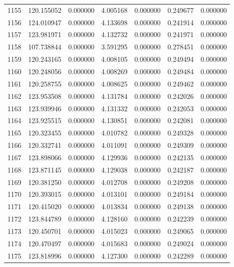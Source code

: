 \begin{tabular}{rrrrrrr}
1155 & 120.155052 &    0.000000 &  4.005168 &   0.000000 &   0.249677 &  0.000000 \\
1156 & 124.010947 &    0.000000 &  4.133698 &   0.000000 &   0.241914 &  0.000000 \\
1157 & 123.981971 &    0.000000 &  4.132732 &   0.000000 &   0.241971 &  0.000000 \\
1158 & 107.738844 &    0.000000 &  3.591295 &   0.000000 &   0.278451 &  0.000000 \\
1159 & 120.243165 &    0.000000 &  4.008105 &   0.000000 &   0.249494 &  0.000000 \\
1160 & 120.248056 &    0.000000 &  4.008269 &   0.000000 &   0.249484 &  0.000000 \\
1161 & 120.258755 &    0.000000 &  4.008625 &   0.000000 &   0.249462 &  0.000000 \\
1162 & 123.953508 &    0.000000 &  4.131784 &   0.000000 &   0.242026 &  0.000000 \\
1163 & 123.939946 &    0.000000 &  4.131332 &   0.000000 &   0.242053 &  0.000000 \\
1164 & 123.925515 &    0.000000 &  4.130851 &   0.000000 &   0.242081 &  0.000000 \\
1165 & 120.323455 &    0.000000 &  4.010782 &   0.000000 &   0.249328 &  0.000000 \\
1166 & 120.332741 &    0.000000 &  4.011091 &   0.000000 &   0.249309 &  0.000000 \\
1167 & 123.898066 &    0.000000 &  4.129936 &   0.000000 &   0.242135 &  0.000000 \\
1168 & 123.871145 &    0.000000 &  4.129038 &   0.000000 &   0.242187 &  0.000000 \\
1169 & 120.381250 &    0.000000 &  4.012708 &   0.000000 &   0.249208 &  0.000000 \\
1170 & 120.393015 &    0.000000 &  4.013101 &   0.000000 &   0.249184 &  0.000000 \\
1171 & 120.415020 &    0.000000 &  4.013834 &   0.000000 &   0.249138 &  0.000000 \\
1172 & 123.844789 &    0.000000 &  4.128160 &   0.000000 &   0.242239 &  0.000000 \\
1173 & 120.450701 &    0.000000 &  4.015023 &   0.000000 &   0.249065 &  0.000000 \\
1174 & 120.470497 &    0.000000 &  4.015683 &   0.000000 &   0.249024 &  0.000000 \\
1175 & 123.818996 &    0.000000 &  4.127300 &   0.000000 &   0.242289 &  0.000000 \\

\end{tabular}

